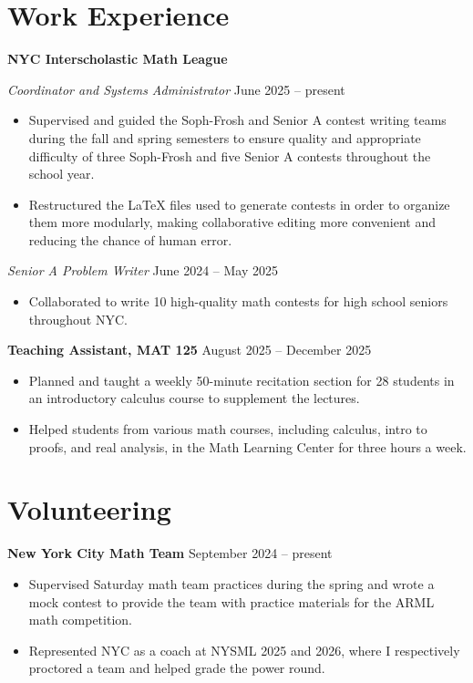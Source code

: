\documentclass[10pt]{article}
\providecommand{\ii}{\item}
\begin{document}
\vspace{-3mm}\section*{Work Experience}
\textbf{NYC Interscholastic Math League}

\emph{Coordinator and Systems Administrator}
\hfill{} June 2025 -- present
\begin{itemize}
    \ii Supervised and guided the Soph-Frosh and Senior A
    contest writing teams during the fall and spring semesters
    to ensure quality and appropriate difficulty of
    three Soph-Frosh and five Senior A contests
    throughout the school year.
    \ii Restructured the \LaTeX{} files used to generate contests
    in order to organize them more modularly,
    making collaborative editing more convenient
    and reducing the chance of human error.
\end{itemize}

\emph{Senior A Problem Writer}
\hfill{}June 2024 -- May 2025

\begin{itemize}
    \ii Collaborated to write 10 high-quality math contests for
    high school seniors throughout NYC.
\end{itemize}

\textbf{Teaching Assistant, MAT 125}
\hfill{} August 2025 -- December 2025
\begin{itemize}
    \ii Planned and taught a weekly 50-minute recitation section
    for 28 students in an introductory calculus course
    to supplement the lectures.
    \ii Helped students from various math courses,
    including calculus, intro to proofs, and real analysis,
    in the Math Learning Center for three hours a week.
\end{itemize}

\vspace{-3mm}\section*{Volunteering}
\textbf{New York City Math Team}
\hfill{}September 2024 -- present

\begin{itemize}
    \ii Supervised Saturday math team practices during the spring
    and wrote a mock contest to provide the team with practice materials
    for the ARML math competition.
    \ii Represented NYC as a coach at NYSML 2025 and 2026,
    where I respectively proctored a team and helped grade the power round.
\end{itemize}
\end{document}
